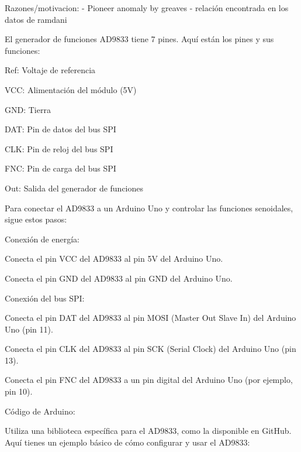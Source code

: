 Razones/motivacion:
  - Pioneer anomaly by greaves
  - relación encontrada en los datos de ramdani

El generador de funciones AD9833 tiene 7 pines. Aquí están los pines y sus funciones:

Ref: Voltaje de referencia

VCC: Alimentación del módulo (5V)

GND: Tierra

DAT: Pin de datos del bus SPI

CLK: Pin de reloj del bus SPI

FNC: Pin de carga del bus SPI

Out: Salida del generador de funciones

Para conectar el AD9833 a un Arduino Uno y controlar las funciones senoidales, sigue estos pasos:

Conexión de energía:

Conecta el pin VCC del AD9833 al pin 5V del Arduino Uno.

Conecta el pin GND del AD9833 al pin GND del Arduino Uno.

Conexión del bus SPI:

Conecta el pin DAT del AD9833 al pin MOSI (Master Out Slave In) del Arduino Uno (pin 11).

Conecta el pin CLK del AD9833 al pin SCK (Serial Clock) del Arduino Uno (pin 13).

Conecta el pin FNC del AD9833 a un pin digital del Arduino Uno (por ejemplo, pin 10).

Código de Arduino:

Utiliza una biblioteca específica para el AD9833, como la disponible en GitHub. Aquí tienes un ejemplo básico de cómo configurar y usar el AD9833: